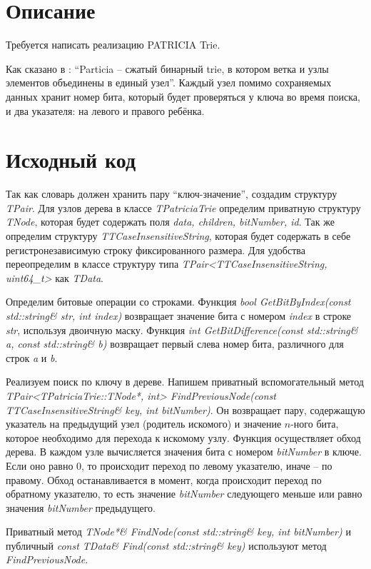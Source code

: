 \section{Описание}
Требуется написать реализацию PATRICIA Trie.

Как сказано в \cite{Mehta}: \enquote{Particia -- сжатый бинарный trie, в котором ветка и узлы элементов объединены в единый узел}.
Каждый узел помимо сохраняемых данных хранит номер бита, который будет проверяться у ключа во время поиска, и два указателя:
на левого и правого ребёнка.

\pagebreak

\section{Исходный код}
Так как словарь должен хранить пару \enquote{ключ-значение}, создадим структуру \textit{TPair}. Для узлов дерева в классе \textit{TPatriciaTrie}
определим приватную структуру \textit{TNode}, которая будет содержать поля \textit{data, children, bitNumber, id}.
Так же определим структуру \textit{TTCaseInsensitiveString}, которая будет содержать в себе регистронезависимую строку фиксированного размера.
Для удобства переопределим в классе структуру типа \textit{TPair<TTCaseInsensitiveString, uint64\_t>} как \textit{TData}.

Определим битовые операции со строками. Функция \textit{bool GetBitByIndex(const std::string\& str, int index)} возвращает
значение бита с номером \textit{index} в строке \textit{str}, используя двоичную маску.
Функция \textit{int GetBitDifference(const std::string\& a, const std::string\& b)} возвращает первый слева номер бита, различного
для строк \textit{a} и \textit{b}.

Реализуем поиск по ключу в дереве. Напишем приватный вспомогательный метод 
\textit{TPair<TPatriciaTrie::TNode*, int> FindPreviousNode(const TTCaseInsensitiveString\& key, int bitNumber)}.
Он возвращает пару, содержащую указатель на предыдущий узел (родитель искомого) и значение $n$-ного бита, которое необходимо для перехода к 
искомому узлу. Функция осуществляет обход дерева. В каждом узле вычисляется значения бита с номером \textit{bitNumber} в ключе. Если оно 
равно 0, то происходит переход по левому указателю, иначе -- по правому. Обход останавливается в момент, когда происходит переход по 
обратному указателю, то есть значение \textit{bitNumber} следующего меньше или равно значения \textit{bitNumber} предыдущего.

Приватный метод \textit{TNode*\& FindNode(const std::string\& key, int bitNumber)} и публичный 
\textit{const TData\& Find(const std::string\& key)} используют метод \textit{FindPreviousNode}.

